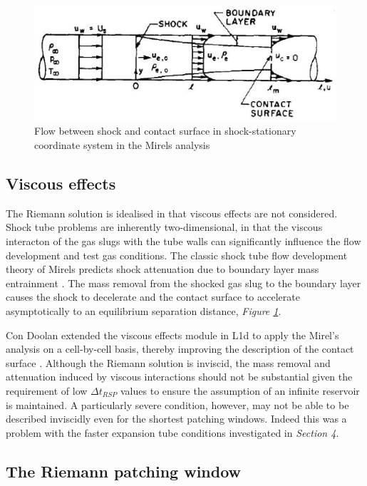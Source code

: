 \documentclass[a4paper,10pt]{article}
\begin{document}
\begin{figure}[hc]
\centering
\includegraphics[scale=0.6]{figs/mirels_fig2.eps}
\caption{Flow between shock and contact surface in shock-stationary coordinate system in the Mirels analysis}
\label{fig:mirels_fig2}
\end{figure}

\subsection{Viscous effects}

The Riemann solution is idealised in that viscous effects are not considered.  Shock tube problems are inherently two-dimensional, in that the viscous interacton of the gas slugs with the tube walls can significantly influence the flow development and test gas conditions.  The classic shock tube flow development theory of Mirels predicts shock attenuation due to boundary layer mass entrainment \cite{mirels_63}.  The mass removal from the shocked gas slug to the boundary layer causes the shock to decelerate and the contact surface to accelerate asymptotically to an equilibrium separation distance, \emph{Figure \ref{fig:mirels_fig2}}.

\par \medskip

Con Doolan \cite{doolan} extended the viscous effects module in L1d to apply the Mirel's analysis on a cell-by-cell basis, thereby improving the description of the contact surface \cite{jacobs_98b}.  Although the Riemann solution is inviscid, the mass removal and attenuation induced by viscous interactions should not be substantial given the requirement of low $\Delta t_{RSP}$ values to ensure the assumption of an infinite reservoir is maintained.  A particularly severe condition, however, may not be able to be described inviscidly even for the shortest patching windows.  Indeed this was a problem with the faster expansion tube conditions investigated in \emph{Section 4}.


\subsection{The Riemann patching window}
\end{document}
